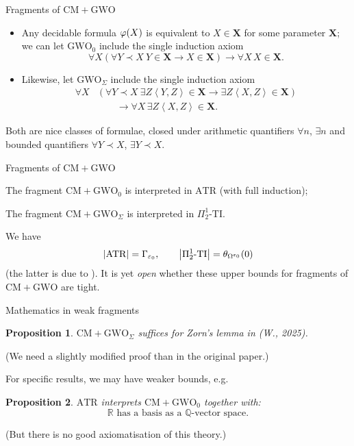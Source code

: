 \documentclass{beamer}
\newtheorem{proposition}{Proposition}
\theoremstyle{definition}
\newcommand{\tuple}[1]{\left\langle #1 \right\rangle}
\newcommand{\CM}{\mathrm{CM}}
\newcommand{\GWO}{\mathrm{GWO}}
\begin{document}
\begin{frame}{Fragments of $\CM + \GWO$}
  \begin{itemize}
    \item Any decidable formula $\varphi\mleft(X\mright)$ is equivalent to $X \in \mathbf{X}$ for some parameter $\mathbf{X}$; we can let $\GWO_0$ include the single induction axiom
          \[\forall X \left(\forall Y \prec X \ Y \in \mathbf{X} \rightarrow X \in \mathbf{X}\right) \rightarrow \forall X \, X \in \mathbf{X}.\]

    \item Likewise, let $\GWO_\Sigma$ include the single induction axiom
          \begin{align*}
            \forall X & \left(\forall Y \prec X \ \exists Z \tuple{Y, Z} \in \mathbf{X} \rightarrow \exists Z \tuple{X, Z} \in \mathbf{X}\right) \\
                      & \qquad {} \rightarrow \forall X \, \exists Z \tuple{X, Z} \in \mathbf{X}.
          \end{align*}
  \end{itemize}

  Both are nice classes of formulae, closed under arithmetic quantifiers $\forall n$, $\exists n$ and bounded quantifiers $\forall Y \prec X$, $\exists Y \prec X$.
\end{frame}

\begin{frame}{Fragments of $\CM + \GWO$}
  \begin{theorem}
    The fragment $\CM + \GWO_0$ is interpreted in $\mathrm{ATR}$ (with full induction);

    The fragment $\CM + \GWO_\Sigma$ is interpreted in $\Pi^1_2\text{-}\mathrm{TI}$.
  \end{theorem}

  \vspace{1em}

  We have
  \[\left|\mathrm{ATR}\right| = \Gamma_{\varepsilon_0}, \qquad \left|\Pi^1_2\text{-}\mathrm{TI}\right| = \theta_{\Omega^{\varepsilon_0}}\mleft(0\mright)\]
  (the latter is due to \cite{rathjen-weiermann93-kruskal-theorem}). It is yet \emph{open} whether these upper bounds for fragments of $\CM + \GWO$ are tight.
\end{frame}

\begin{frame}{Mathematics in weak fragments}
  \begin{proposition}
    $\CM + \GWO_\Sigma$ suffices for Zorn's lemma in (W., 2025).
  \end{proposition}
  (We need a slightly modified proof than in the original paper.)

  \pause

  \vspace{1.6em}

  For specific results, we may have weaker bounds, e.g.
  \begin{proposition}
    $\mathrm{ATR}$ interprets $\CM + \GWO_0$ together with:
    \[\text{$\mathbb{R}$ has a basis as a $\mathbb{Q}$-vector space}.\]
  \end{proposition}
  (But there is no good axiomatisation of this theory.)
\end{frame}
\end{document}
